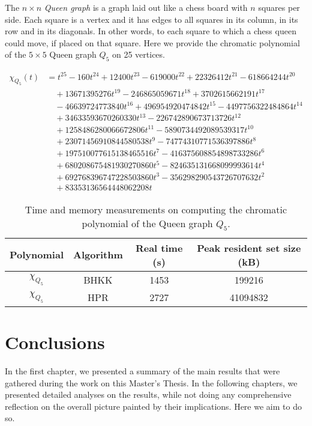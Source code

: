 \documentclass{cslthse-msc}
\begin{document}
The $n \times n$ \emph{Queen graph} is a graph laid out like a chess board with $n$ squares per side. Each square is a vertex and it has edges to all squares in its column, in its row and in its diagonals. In other words, to each square to which a chess queen could move, if placed on that square. Here we provide the chromatic polynomial of the $5 \times 5$ Queen graph $Q_5$ on 25 vertices.

\begin{equation*}
\begin{split}
\chi_{Q_5}(t) & = t^{25} -160t^{24} + 12400t^{23} -619000t^{22} + 22326412t^{21} -618664244t^{20} \\ & \quad 
+ 13671395276t^{19} -246865059671t^{18} + 3702615662191t^{17} \\ & \quad
-46639724773840t^{16} + 496954920474842t^{15}  -4497756322484864t^{14} \\ & \quad 
+ 34633593670260330t^{13} -226742890673713726t^{12} \\ & \quad 
+ 1258486280066672806t^{11} -5890734492089539317t^{10} \\ & \quad 
+ 23071456910844580538t^9 -74774310771536397886t^8 \\ & \quad  
+ 197510077615138465516t^7 -416375608854898733286t^6  \\ & \quad 
+ 680208675481930270860t^5 -824635131668099993614t^4 \\ & \quad 
+ 692768396747228503860t^3 -356298290543726707632t^2  \\ & \quad 
+ 83353136564448062208t
\end{split}
\end{equation*}

\begin{table}[H]\centering
\begin{tabular}{|c|c|c|c|} \hline
  Polynomial & Algorithm & Real time (s) & Peak resident set size (kB) \\ \hline
  $\chi_{Q_5}$ & BHKK & 1453 & 199216 \\ \hline
  $\chi_{Q_5}$ & HPR & 2727 & 41094832 \\ \hline
\end{tabular}
\caption{Time and memory measurements on computing the chromatic polynomial of the Queen graph $Q_5$.}
\end{table}

\chapter{Conclusions}
In the first chapter, we presented a summary of the main results that were gathered during the work on this Master's Thesis. In the following chapters, we presented detailed analyses on the results, while not doing any comprehensive reflection on the overall picture painted by their implications. Here we aim to do so.
\end{document}
